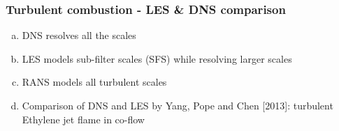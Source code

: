 \documentclass{beamer}
\begin{document}
\begin{frame}%
\frametitle{Turbulent combustion - LES \& DNS comparison}
\scriptsize
\begin{enumerate}[(a)]
\item DNS resolves all the scales 
\item LES models sub-filter scales (SFS) while resolving larger scales 
\item RANS models all turbulent scales 
\item Comparison of DNS and LES by Yang, Pope and Chen [2013]\cite{Pope}: turbulent Ethylene jet flame in co-flow

\vspace{-15pt}
\begin{figure}
\label{fig:DNSLES}
\centering
{}
\end{figure}
\end{enumerate}
\end{frame}
\end{document}
